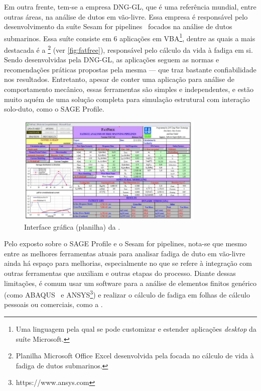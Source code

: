 Em outra frente, tem-se a empresa DNG-GL, que é uma referência mundial, entre outras áreas, na análise de dutos em vão-livre.
Essa empresa é responsável pelo desenvolvimento da suíte Sesam for pipelines~\cite{dnvsesam} focados na análise de dutos submarinos.
Essa suíte consiste em 6 aplicações em VBA\footnote{Uma linguagem pela qual se pode customizar e estender aplicações \textit{desktop} da suíte Microsoft.}, dentre as quais a mais destacada é a \fatfree\footnote{Planilha Microsoft Office Excel desenvolvida pela  focada no cálculo de vida à fadiga de dutos submarinos.} (ver \autoref{fig:fatfree}), responsável pelo cálculo da vida à fadiga em si. Sendo desenvolvidas pela DNG-GL, as aplicações seguem as normas e recomendações práticas propostas pela mesma --- que traz bastante confiabilidade nos resultados. Entretanto, apesar de conter uma aplicação para análise de comportamento mecânico, essas ferramentas são simples e independentes, e estão muito aquém de uma solução completa para simulação estrutural com interação solo-duto, como o SAGE Profile.

\begin{figure}[!ht]
    \centering
    \caption{Interface gráfica (planilha) da \fatfree.}\label{fig:fatfree}
    \includegraphics[width=0.8\textwidth]{imagens/fatfree}
\end{figure}

Pelo exposto sobre o SAGE Profile e o Sesam for pipelines, nota-se que mesmo entre as melhores ferramentas atuais para analisar fadiga de duto em vão-livre ainda há espaço para melhorias, especialmente no que se refere à integração com outras ferramentas que auxiliam e outras etapas do processo. Diante dessas limitações, é comum usar um software para a análise de elementos finitos genérico (como ABAQUS~\cite{Dassault2018} e ANSYS\footnote{https://www.ansys.com}) e realizar o cálculo de fadiga em folhas de cálculo pessoais ou comerciais, como a \fatfree.


